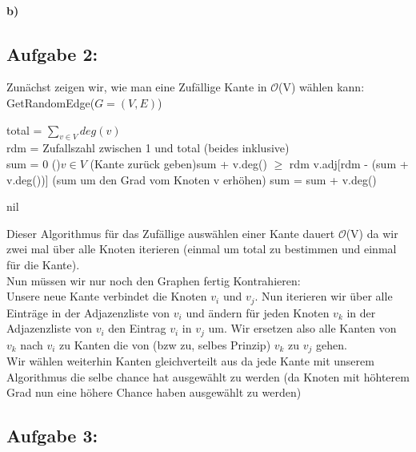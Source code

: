 \documentclass[a4paper]{article}
\def\Oh{\ensuremath{\mathcal{O}}} %
\begin{document}
\paragraph*{b)}
\subsection*{Aufgabe 2:}
Zunächst zeigen wir, wie man eine Zufällige Kante in \Oh(V) wählen kann: \\
\noindent GetRandomEdge($G = (V, E)$)\\
\begin{algorithm}[H]
    total = $\sum_{v \in V} deg(v)$ \\
    rdm = Zufallszahl zwischen 1 und total (beides inklusive) \\
	sum = 0 \;
    \For(){$v \in V$}{
        \If(Kante zurück geben){sum + v.deg() $\geq$ rdm}{
            \Return v.adj[rdm - (sum + v.deg())]
        } \Else(sum um den Grad vom Knoten v erhöhen){
            sum = sum + v.deg()
        }
    }

	\Return nil\;
\end{algorithm}
Dieser Algorithmus für das Zufällige auswählen einer Kante dauert \Oh(V) da wir zwei mal über alle Knoten 
iterieren (einmal um total zu bestimmen und einmal für die Kante). \\
Nun müssen wir nur noch den Graphen fertig Kontrahieren: \\
Unsere neue Kante verbindet die Knoten $v_i$ und $v_j$. Nun iterieren wir über alle Einträge
in der Adjazenzliste von $v_i$ und ändern für jeden Knoten $v_k$ in der Adjazenzliste von $v_i$
den Eintrag $v_i$ in $v_j$ um. Wir ersetzen also alle Kanten von $v_k$ nach $v_i$ zu Kanten die 
von (bzw zu, selbes Prinzip) $v_k$ zu $v_j$ gehen. \\
Wir wählen weiterhin Kanten gleichverteilt aus da jede Kante mit unserem Algorithmus die selbe chance
hat ausgewählt zu werden (da Knoten mit höhterem Grad nun eine höhere Chance haben ausgewählt zu werden)
\subsection*{Aufgabe 3:}
\end{document}
